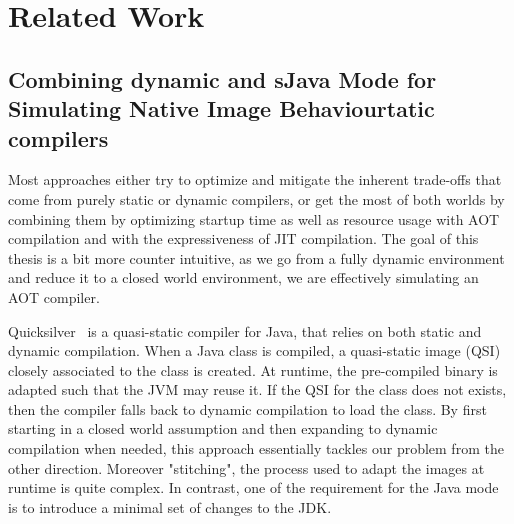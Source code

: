 \chapter{Related Work}

\section{Combining dynamic and sJava Mode for Simulating Native Image Behaviourtatic compilers}
Most approaches either try to optimize and mitigate the inherent trade-offs that come from purely static or dynamic compilers, or get the most of both worlds by combining them by optimizing startup time as well as resource usage with AOT compilation and with the expressiveness of JIT compilation.
The goal of this thesis is a bit more counter intuitive, as we go from a fully dynamic environment and reduce it to a closed world environment, we are effectively simulating an AOT compiler.

Quicksilver~\cite{serrano_quicksilver_2000} is a quasi-static compiler for Java, that relies on both static and dynamic compilation. 
When a Java class is compiled, a quasi-static image (QSI) closely associated to the class is created. At runtime, the pre-compiled binary is adapted such that the JVM may reuse it. If the QSI for the class does not exists, then the compiler falls back to dynamic compilation to load the class. 
By first starting in a closed world assumption and then expanding to dynamic compilation when needed, this approach essentially tackles our problem from the other direction.
Moreover "stitching", the process used to adapt the images at runtime is quite complex. In contrast, one of the requirement for the Java mode is to introduce a minimal set of changes to the JDK.


